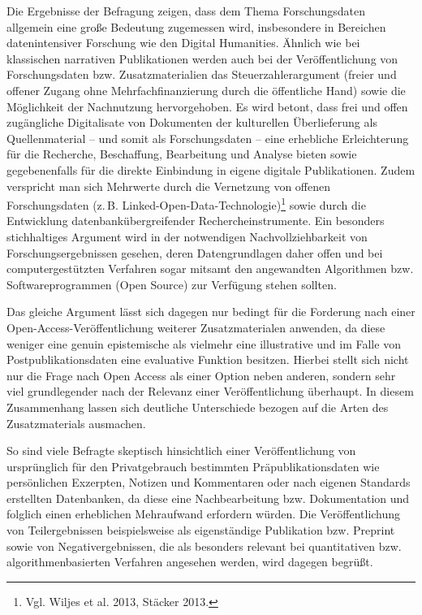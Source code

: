 \documentclass[a4paper,
fontsize=11pt,
oneside,
numbers=noperiodatend,
parskip=half-,
bibliography=totoc,
final
]{scrartcl}
\begin{document}
Die Ergebnisse der Befragung zeigen, dass dem Thema Forschungsdaten
allgemein eine große Bedeutung zugemessen wird, insbesondere in
Bereichen datenintensiver Forschung wie den Digital Humanities. Ähnlich
wie bei klassischen narrativen Publikationen werden auch bei der
Veröffentlichung von Forschungsdaten bzw. Zusatzmaterialien das
Steuerzahlerargument (freier und offener Zugang ohne
Mehrfachfinanzierung durch die öffentliche Hand) sowie die Möglichkeit
der Nachnutzung hervorgehoben. Es wird betont, dass frei und offen
zugängliche Digitalisate von Dokumenten der kulturellen Überlieferung
als Quellenmaterial -- und somit als Forschungsdaten -- eine erhebliche
Erleichterung für die Recherche, Beschaffung, Bearbeitung und Analyse
bieten sowie gegebenenfalls für die direkte Einbindung in eigene
digitale Publikationen. Zudem verspricht man sich Mehrwerte durch die
Vernetzung von offenen Forschungsdaten (z.\,B.
Linked-Open-Data-Technologie)\footnote{Vgl. Wiljes et al. 2013, Stäcker
  2013.} sowie durch die Entwicklung datenbankübergreifender
Rechercheinstrumente. Ein besonders stichhaltiges Argument wird in der
notwendigen Nachvollziehbarkeit von Forschungsergebnissen gesehen, deren
Datengrundlagen daher offen und bei computergestützten Verfahren sogar
mitsamt den angewandten Algorithmen bzw. Softwareprogrammen (Open
Source) zur Verfügung stehen sollten.

Das gleiche Argument lässt sich dagegen nur bedingt für die Forderung
nach einer Open-Access-Veröffentlichung weiterer Zusatzmaterialen
anwenden, da diese weniger eine genuin epistemische als vielmehr eine
illustrative und im Falle von Postpublikationsdaten eine evaluative
Funktion besitzen. Hierbei stellt sich nicht nur die Frage nach Open
Access als einer Option neben anderen, sondern sehr viel grundlegender
nach der Relevanz einer Veröffentlichung überhaupt. In diesem
Zusammenhang lassen sich deutliche Unterschiede bezogen auf die Arten
des Zusatzmaterials ausmachen.

So sind viele Befragte skeptisch hinsichtlich einer Veröffentlichung von
ursprünglich für den Privatgebrauch bestimmten Präpublikationsdaten wie
persönlichen Exzerpten, Notizen und Kommentaren oder nach eigenen
Standards erstellten Datenbanken, da diese eine Nachbearbeitung bzw.
Dokumentation und folglich einen erheblichen Mehraufwand erfordern
würden. Die Veröffentlichung von Teilergebnissen beispielsweise als
eigenständige Publikation bzw. Preprint sowie von Negativergebnissen,
die als besonders relevant bei quantitativen bzw. algorithmenbasierten
Verfahren angesehen werden, wird dagegen begrüßt.
\end{document}
